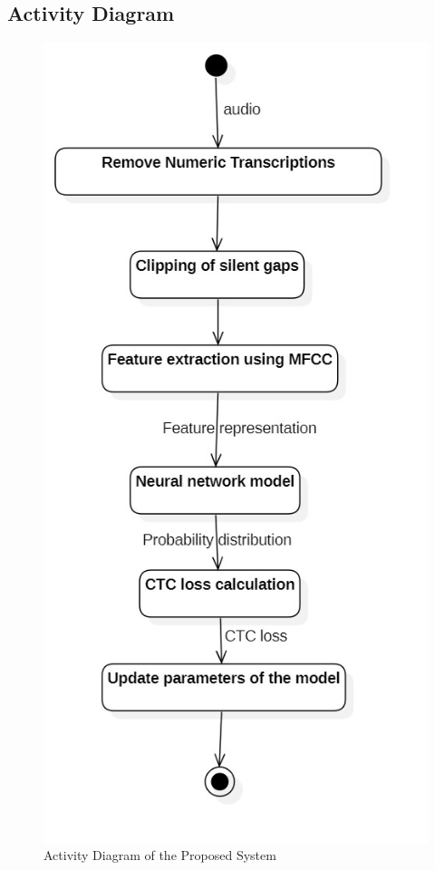 \subsection*{Activity Diagram}
\begin{figure}[h]
	\centering
    \includegraphics[scale=0.5]{images/ActivityDiagram1.jpg}
    \caption{Activity Diagram of the Proposed System}
    \label{fig:my_label}
\end{figure}
\newpage



